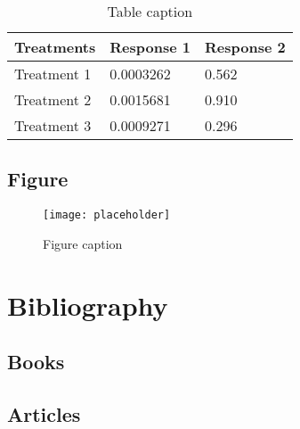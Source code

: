 \documentclass[11pt,fleqn]{book} %
\begin{document}
\begin{table}[h]
\centering
\begin{tabular}{l l l}
\toprule
\textbf{Treatments} & \textbf{Response 1} & \textbf{Response 2}\\
\midrule
Treatment 1 & 0.0003262 & 0.562 \\
Treatment 2 & 0.0015681 & 0.910 \\
Treatment 3 & 0.0009271 & 0.296 \\
\bottomrule
\end{tabular}
\caption{Table caption}
\end{table}


\section{Figure}

\begin{figure}[h]
\centering\texttt{[image: placeholder]}
\caption{Figure caption}
\end{figure}


\chapter*{Bibliography}
\section*{Books}
\printbibliography[heading=bibempty,type=book]
\section*{Articles}
\printbibliography[heading=bibempty,type=article]


\cleardoublepage
{}
\setlength{\columnsep}{0.75cm}
\printindex

\end{document}
